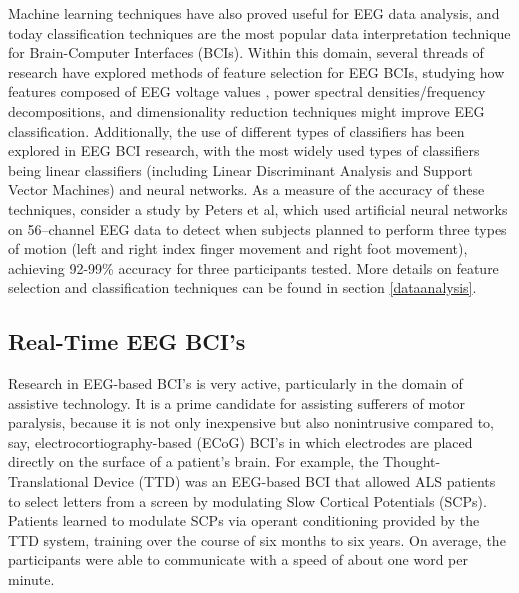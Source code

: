\documentclass[12pt]{report}
\begin{document}
	Machine learning techniques have also proved useful for EEG data analysis, and today classification techniques are the most popular data interpretation technique for Brain-Computer Interfaces (BCIs)\cite{Lotte}.  Within this domain, several threads of research have explored methods of feature selection for EEG BCIs, studying how features composed of EEG voltage values\cite{Kaper} , power spectral densities/frequency decompositions\cite{Herman}, and dimensionality reduction techniques\cite{Kachenoura} might improve EEG classification.  Additionally, the use of different types of classifiers has been explored in EEG BCI research, with the most widely used types of classifiers being linear classifiers (including Linear Discriminant Analysis and Support Vector Machines) and neural networks\cite{Lotte}.  As a measure of the accuracy of these techniques, consider a study by Peters et al\cite{Peters}, which used artificial neural networks on 56--channel EEG data to detect when subjects planned to perform three types of motion (left and right index finger movement and right foot movement), achieving 92-99\% accuracy for three participants tested.  More details on feature selection and classification techniques can be found in section \ref{dataanalysis}.  

\subsection{Real-Time EEG BCI's}
Research in EEG-based BCI's is very active, particularly in the domain of assistive technology.  It is a prime candidate for assisting sufferers of motor paralysis, because it is not only inexpensive but also nonintrusive compared to, say, electrocortiography-based (ECoG) BCI's in which electrodes are placed directly on the surface of a patient's brain.  For example, the Thought-Translational Device (TTD)\cite{Birbaumer} was an EEG-based BCI that allowed ALS patients to select letters from a screen by modulating Slow Cortical Potentials (SCPs).  Patients learned to modulate SCPs via operant conditioning provided by the TTD system, training over the course of six months to six years.  On average, the participants were able to communicate with a speed of about one word per minute.  
\end{document}
